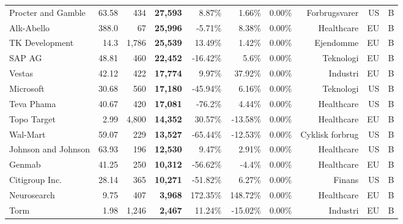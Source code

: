 \begin{tabular}{lrrrrrrrrr}
Procter and Gamble & 63.58 & 434 & \bf{27,593} & 8.87\% & 1.66\% & 0.00\% & Forbrugsvarer & US & B\\
Alk-Abello & 388.0 & 67 & \bf{25,996} & -5.71\% & 8.38\% & 0.00\% & Healthcare & EU & B\\
TK Development & 14.3 & 1,786 & \bf{25,539} & 13.49\% & 1.42\% & 0.00\% & Ejendomme & EU & B\\
SAP AG & 48.81 & 460 & \bf{22,452} & -16.42\% & 5.6\% & 0.00\% & Teknologi & EU & B\\
Vestas & 42.12 & 422 & \bf{17,774} & 9.97\% & 37.92\% & 0.00\% & Industri & EU & B\\
Microsoft & 30.68 & 560 & \bf{17,180} & -45.94\% & 6.16\% & 0.00\% & Teknologi & US & B\\
Teva Phama & 40.67 & 420 & \bf{17,081} & -76.2\% & 4.44\% & 0.00\% & Healthcare & US & B\\
Topo Target & 2.99 & 4,800 & \bf{14,352} & 30.57\% & -13.58\% & 0.00\% & Healthcare & EU & B\\
Wal-Mart & 59.07 & 229 & \bf{13,527} & -65.44\% & -12.53\% & 0.00\% & Cyklisk forbrug & US & B\\
Johnson and Johnson & 63.93 & 196 & \bf{12,530} & 9.47\% & 2.91\% & 0.00\% & Healthcare & US & B\\
Genmab & 41.25 & 250 & \bf{10,312} & -56.62\% & -4.4\% & 0.00\% & Healthcare & EU & B\\
Citigroup Inc. & 28.14 & 365 & \bf{10,271} & -51.82\% & 6.27\% & 0.00\% & Finans & US & B\\
Neurosearch & 9.75 & 407 & \bf{3,968} & 172.35\% & 148.72\% & 0.00\% & Healthcare & EU & B\\
Torm & 1.98 & 1,246 & \bf{2,467} & 11.24\% & -15.02\% & 0.00\% & Industri & EU & B\\
\end{tabular}